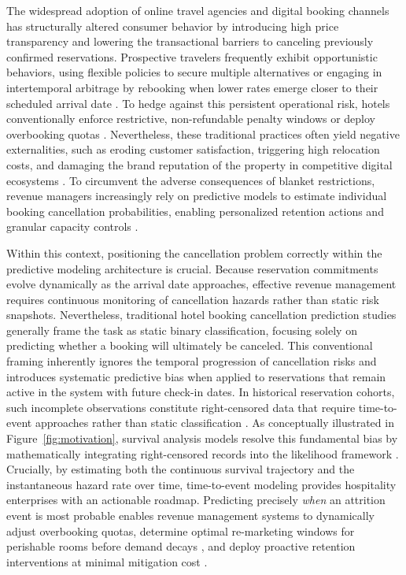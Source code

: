 \documentclass[pdflatex,sn-mathphys-ay]{sn-jnl}%
\theoremstyle{thmstyleone}%
\theoremstyle{thmstyletwo}%
\theoremstyle{thmstylethree}%
\begin{document}
The widespread adoption of online travel agencies and digital booking channels has structurally altered consumer behavior by introducing high price transparency and lowering the transactional barriers to canceling previously confirmed reservations. Prospective travelers frequently exhibit opportunistic behaviors, using flexible policies to secure multiple alternatives \citep{chen2023prediction} or engaging in intertemporal arbitrage by rebooking when lower rates emerge \citep{mir2026decoding} closer to their scheduled arrival date \citep{ampountolas2025predicting}. To hedge against this persistent operational risk, hotels conventionally enforce restrictive, non-refundable penalty windows \citep{yang2024predicting} or deploy overbooking quotas \citep{antonio2017predicting}. Nevertheless, these traditional practices often yield negative externalities, such as eroding customer satisfaction, triggering high relocation costs, and damaging the brand reputation of the property in competitive digital ecosystems \citep{falk2018modelling}. To circumvent the adverse consequences of blanket restrictions, revenue managers increasingly rely on predictive models to estimate individual booking cancellation probabilities, enabling personalized retention actions and granular capacity controls \citep{antonio2017predicting, liu2023hospitality, talal2025hotel}.

Within this context, positioning the cancellation problem correctly within the predictive modeling architecture is crucial. Because reservation commitments evolve dynamically as the arrival date approaches, effective revenue management requires continuous monitoring of cancellation hazards rather than static risk snapshots. Nevertheless, traditional hotel booking cancellation prediction studies generally frame the task as static binary classification, focusing solely on predicting whether a booking will ultimately be canceled. This conventional framing inherently ignores the temporal progression of cancellation risks and introduces systematic predictive bias when applied to reservations that remain active in the system with future check-in dates. In historical reservation cohorts, such incomplete observations constitute right-censored data that require time-to-event approaches rather than static classification \citep{kleinbaum2012survival, langbein2025interpretable}. As conceptually illustrated in Figure~\ref{fig:motivation}, survival analysis models resolve this fundamental bias by mathematically integrating right-censored records into the likelihood framework \citep{kovalev2020survlime, langbein2025interpretable}. Crucially, by estimating both the continuous survival trajectory and the instantaneous hazard rate over time, time-to-event modeling provides hospitality enterprises with an actionable roadmap. Predicting precisely \textit{when} an attrition event is most probable enables revenue management systems to dynamically adjust overbooking quotas, determine optimal re-marketing windows for perishable rooms before demand decays \citep{mir2026decoding}, and deploy proactive retention interventions at minimal mitigation cost \citep{antonio2017predicting, ampountolas2025predicting}.
\end{document}
